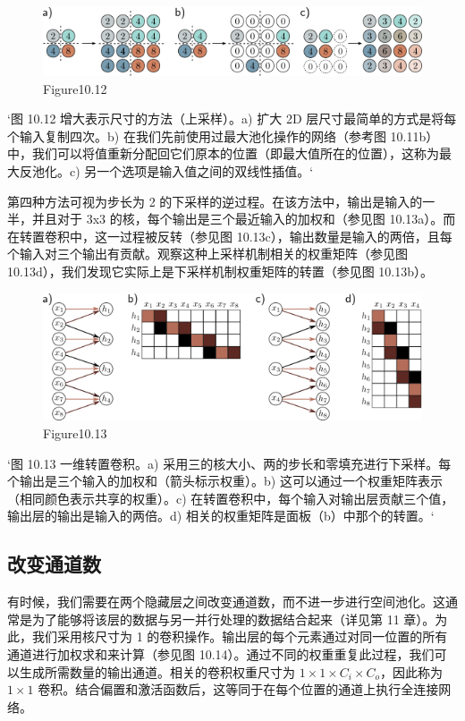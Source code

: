 \begin{figure}[h!]
\centering
\includegraphics[width=0.7\linewidth]{png/chapter10/ConvUp.png}
\caption{Figure10.12}
\end{figure}

`图 10.12 增大表示尺寸的方法（上采样）。a) 扩大 2D 层尺寸最简单的方式是将每个输入复制四次。b) 在我们先前使用过最大池化操作的网络（参考图 10.11b）中，我们可以将值重新分配回它们原本的位置（即最大值所在的位置），这称为最大反池化。c) 另一个选项是输入值之间的双线性插值。`

第四种方法可视为步长为 2 的下采样的逆过程。在该方法中，输出是输入的一半，并且对于 3x3 的核，每个输出是三个最近输入的加权和（参见图 10.13a）。而在转置卷积中，这一过程被反转（参见图 10.13c），输出数量是输入的两倍，且每个输入对三个输出有贡献。观察这种上采样机制相关的权重矩阵（参见图 10.13d），我们发现它实际上是下采样机制权重矩阵的转置（参见图 10.13b）。


\begin{figure}[h!]
\centering
\includegraphics[width=0.7\linewidth]{png/chapter10/ConvTranspose.png}
\caption{Figure10.13}
\end{figure}

`图 10.13 一维转置卷积。a) 采用三的核大小、两的步长和零填充进行下采样。每个输出是三个输入的加权和（箭头标示权重）。b) 这可以通过一个权重矩阵表示（相同颜色表示共享的权重）。c) 在转置卷积中，每个输入对输出层贡献三个值，输出层的输出是输入的两倍。d) 相关的权重矩阵是面板（b）中那个的转置。`

\subsection{改变通道数}
有时候，我们需要在两个隐藏层之间改变通道数，而不进一步进行空间池化。这通常是为了能够将该层的数据与另一并行处理的数据结合起来（详见第 11 章）。为此，我们采用核尺寸为 1 的卷积操作。输出层的每个元素通过对同一位置的所有通道进行加权求和来计算（参见图 10.14）。通过不同的权重重复此过程，我们可以生成所需数量的输出通道。相关的卷积权重尺寸为 \(1 \times 1 \times C_i \times C_o\)，因此称为 \(1 \times 1\) 卷积。结合偏置和激活函数后，这等同于在每个位置的通道上执行全连接网络。


